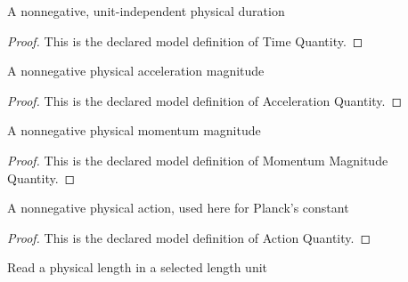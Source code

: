 \begin{definition}
  \label{def:physics:phyx-mini-0655:phyxminiproblems-problemphyxmini0655-timequantity}
  A nonnegative, unit-independent physical duration
\end{definition}
\begin{proof}
  This is the declared model definition of Time Quantity.
\end{proof}
\begin{definition}
  \label{def:physics:phyx-mini-0655:phyxminiproblems-problemphyxmini0655-accelerationquantity}
  A nonnegative physical acceleration magnitude
\end{definition}
\begin{proof}
  This is the declared model definition of Acceleration Quantity.
\end{proof}
\begin{definition}
  \label{def:physics:phyx-mini-0655:phyxminiproblems-problemphyxmini0655-momentummagnitudequantity}
  A nonnegative physical momentum magnitude
\end{definition}
\begin{proof}
  This is the declared model definition of Momentum Magnitude Quantity.
\end{proof}
\begin{definition}
  \label{def:physics:phyx-mini-0655:phyxminiproblems-problemphyxmini0655-actionquantity}
  A nonnegative physical action, used here for Planck's constant
\end{definition}
\begin{proof}
  This is the declared model definition of Action Quantity.
\end{proof}
\begin{definition}
  \label{def:physics:phyx-mini-0655:phyxminiproblems-problemphyxmini0655-lengthreadout}
  Read a physical length in a selected length unit
\end{definition}
